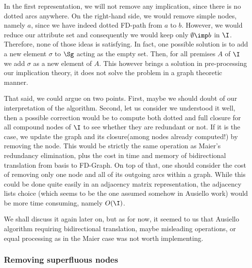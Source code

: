 \vspace{1.2em}

In the first representation, we will not remove any implication, since there
is no dotted arcs anywhere. On the right-hand side, we would remove simple
nodes, namely $a$, since we have indeed dotted FD-path from $a$ to $b$.
However, we would reduce our attribute set and consequently we would keep only
$\emptyset \imp b$ in $\I$. Therefore, none of those ideas is satisfying. In fact, one possible solution is to add a new element $\sigma$ to $\Sg$ acting
as the empty set. Then, for all premises $A$ of $\I$ we add $\sigma$ as a new
element of $A$. This however brings a solution in pre-processing our implication
theory, it does not solve the problem in a graph theoretic manner.

\vspace{1.2em}

That said, we could argue on two points. First, maybe we should doubt of our
interpretation of the algorithm. Second, let us consider we understood it well,
then a possible correction would be to compute both dotted and full closure for
all compound nodes of $\I$ to see whether they are redundant or not. If it is the case, we update the graph and its closure(among nodes already computed!) by removing the node. This would be strictly the same operation as Maier's redundancy elimination, plus the cost in time and memory of bidirectional translation from basis to FD-Graph. On top of that, one should consider the cost of removing only one node and all of its outgoing arcs within a graph. While this could be done quite easily in an adjacency matrix representation, the adjacency lists choice (which seems to be the one assumed somehow in Ausiello work) would be more time consuming, namely $O(\I)$. 

\vspace{1.2em}

We shall discuss it again later on, but as for now, it seemed to us that  Ausiello algorithm requiring bidirectional translation, maybe misleading operations, or equal processing as in the Maier case was not worth implementing.


\subsubsection{Removing superfluous nodes}

